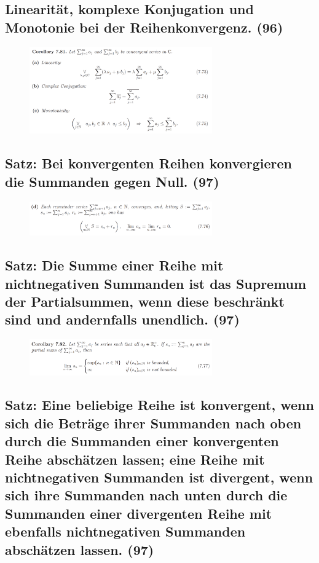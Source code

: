\subsection{Linearität, komplexe Konjugation und Monotonie bei der Reihenkonvergenz. (96)}

\begin{figure}[H] \centering
\includegraphics[width=0.7\textwidth]{media/8-4.png}
\end{figure}

\subsection{Satz: Bei konvergenten Reihen konvergieren die Summanden gegen Null. (97)}

\begin{figure}[H] \centering
\includegraphics[width=0.7\textwidth]{media/8-5.png}
\end{figure}

\subsection{Satz: Die Summe einer Reihe mit nichtnegativen Summanden ist das Supremum der Partialsummen, wenn diese beschränkt sind und andernfalls unendlich. (97)}

\begin{figure}[H] \centering
\includegraphics[width=0.7\textwidth]{media/8-6.png}
\end{figure}

\subsection{Satz: Eine beliebige Reihe ist konvergent, wenn sich die Beträge ihrer Summanden nach oben durch die Summanden einer konvergenten Reihe abschätzen lassen; eine Reihe mit nichtnegativen Summanden ist divergent, wenn sich ihre Summanden nach unten durch die Summanden einer divergenten Reihe mit ebenfalls nichtnegativen Summanden abschätzen lassen. (97)}


